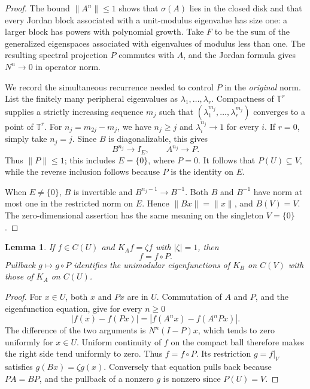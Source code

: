 \documentclass[11pt]{article}
\newtheorem{lemma}[theorem]{Lemma}
\newcommand{\T}{\mathbb T}
\begin{document}
\begin{proof}
The bound \(\|A^n\|\leq1\) shows that \(\sigma(A)\) lies in the closed
disk and that every Jordan block associated with a unit-modulus
eigenvalue has size one: a larger block has powers with polynomial
growth. Take \(F\) to be the sum of the generalized eigenspaces associated
with eigenvalues of modulus less than one. The resulting spectral
projection \(P\) commutes with \(A\), and the Jordan formula gives
\(N^n\to0\) in operator norm.

We record the simultaneous recurrence needed to control \(P\) in the
\emph{original} norm. List the finitely many peripheral eigenvalues
as \(\lambda_1,\ldots,\lambda_r\). Compactness of \(\T^r\) supplies a
strictly increasing sequence \(m_j\) such that
\((\lambda_1^{m_j},\ldots,\lambda_r^{m_j})\) converges to a point of
\(\T^r\). For \(n_j=m_{2j}-m_j\), we have \(n_j\geq j\) and
\(\lambda_i^{n_j}\to1\) for every \(i\). If \(r=0\), simply take \(n_j=j\).
Since \(B\) is diagonalizable, this gives
\[
 B^{n_j}\longrightarrow I_E,\qquad A^{n_j}\longrightarrow P.
\]
Thus \(\|P\|\leq1\); this includes \(E=\{0\}\), where \(P=0\).
It follows that \(P(U)\subseteq V\), while the reverse inclusion follows
because \(P\) is the identity on \(E\).

When \(E\neq\{0\}\), \(B\) is invertible and
\(B^{n_j-1}\to B^{-1}\). Both \(B\) and \(B^{-1}\) have norm at most one
in the restricted norm on \(E\). Hence
\(\|Bx\|=\|x\|\), and \(B(V)=V\).
The zero-dimensional assertion has the same meaning on the singleton
\(V=\{0\}\).
\end{proof}

\begin{lemma}\label{lem:factor}
If \(f\in C(U)\) and \(K_Af=\zeta f\) with \(|\zeta|=1\), then
\[
 f=f\circ P.
\]
Pullback \(g\mapsto g\circ P\) identifies the unimodular eigenfunctions
of \(K_B\) on \(C(V)\) with those of \(K_A\) on \(C(U)\).
\end{lemma}

\begin{proof}
For \(x\in U\), both \(x\) and \(Px\) are in \(U\). Commutation of \(A\)
and \(P\), and the eigenfunction equation, give for every \(n\geq0\)
\[
 |f(x)-f(Px)|=|f(A^nx)-f(A^nPx)|.
\]
The difference of the two arguments is
\(N^n(I-P)x\), which tends to zero uniformly for \(x\in U\).
Uniform continuity of \(f\) on the compact ball therefore makes the
right side tend uniformly to zero. Thus \(f=f\circ P\).
Its restriction \(g=f|_V\) satisfies \(g(Bx)=\zeta g(x)\).
Conversely that equation pulls back because \(PA=BP\), and the
pullback of a nonzero \(g\) is nonzero since \(P(U)=V\).
\end{proof}
\end{document}
